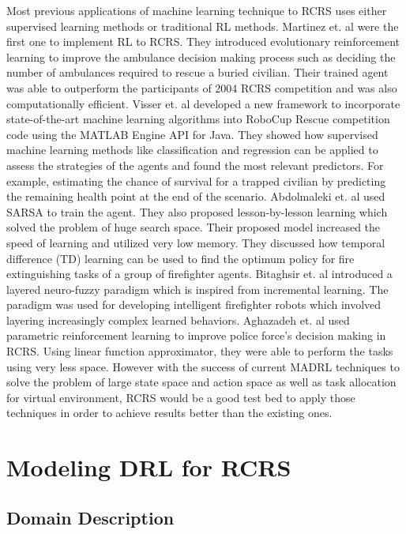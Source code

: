 \documentclass[12pt]{report}
\begin{document}
Most previous applications of machine learning technique to RCRS uses either supervised learning methods or traditional RL methods. Martinez et. al \cite{Martinez} were the first one to implement RL to RCRS. They introduced evolutionary reinforcement learning to improve the ambulance decision making process such as deciding the number of ambulances required to rescue a buried civilian. Their trained agent was able to outperform the participants of 2004 RCRS competition and was also computationally efficient. Visser et. al \cite{Visser2018RoboCupRS} developed a new framework to incorporate state-of-the-art machine learning algorithms into RoboCup Rescue competition code using the MATLAB Engine API for Java. They showed how supervised machine learning methods like classification and regression can be applied to assess the strategies of the agents and found the most relevant predictors. For example, estimating the chance of survival for a trapped civilian by predicting the remaining health point at the end of the scenario. Abdolmaleki et. al \cite{abdolmaleki} used SARSA to train the agent. They also proposed lesson-by-lesson learning which solved the problem of huge search space. Their proposed model increased the speed of learning and utilized very low memory. They discussed how temporal difference (TD) learning can be used to find the optimum policy for fire extinguishing tasks of a group of firefighter agents. Bitaghsir et. al \cite{Bitaghsir} introduced a layered neuro-fuzzy paradigm which is inspired from incremental learning. The paradigm was used for developing intelligent firefighter robots which involved layering increasingly complex learned behaviors. Aghazadeh et. al \cite{Aghazadeh} used parametric reinforcement learning to improve police force's decision making in RCRS. Using linear function approximator, they were able to perform the tasks using very less space. However with the success of current MADRL techniques to solve the problem of large state space and action space as well as task allocation for virtual environment, RCRS would be a good test bed to apply those techniques in order to achieve results better than the existing ones.  

\chapter{Modeling DRL for RCRS}

\section{Domain Description}
\end{document}
